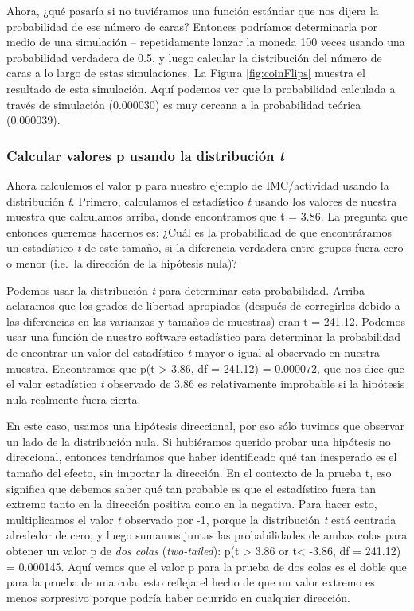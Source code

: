 \documentclass[
  12pt,
]{book}
\begin{document}
Ahora, ¿qué pasaría si no tuviéramos una función estándar que nos dijera la probabilidad de ese número de caras? Entonces podríamos determinarla por medio de una simulación -- repetidamente lanzar la moneda 100 veces usando una probabilidad verdadera de 0.5, y luego calcular la distribución del número de caras a lo largo de estas simulaciones. La Figura \ref{fig:coinFlips} muestra el resultado de esta simulación. Aquí podemos ver que la probabilidad calculada a través de simulación (0.000030) es muy cercana a la probabilidad teórica (0.000039).

\hypertarget{pvalues-tdist}{%
\subsubsection{\texorpdfstring{Calcular valores p usando la distribución \emph{t}}{Calcular valores p usando la distribución t}}\label{pvalues-tdist}}

Ahora calculemos el valor p para nuestro ejemplo de IMC/actividad usando la distribución \emph{t}. Primero, calculamos el estadístico \emph{t} usando los valores de nuestra muestra que calculamos arriba, donde encontramos que t = 3.86. La pregunta que entonces queremos hacernos es: ¿Cuál es la probabilidad de que encontráramos un estadístico \emph{t} de este tamaño, si la diferencia verdadera entre grupos fuera cero o menor (i.e.~la dirección de la hipótesis nula)?

Podemos usar la distribución \emph{t} para determinar esta probabilidad. Arriba aclaramos que los grados de libertad apropiados (después de corregirlos debido a las diferencias en las varianzas y tamaños de muestras) eran t = 241.12. Podemos usar una función de nuestro software estadístico para determinar la probabilidad de encontrar un valor del estadístico \emph{t} mayor o igual al observado en nuestra muestra. Encontramos que p(t \textgreater{} 3.86, df = 241.12) = 0.000072, que nos dice que el valor estadístico \emph{t} observado de 3.86 es relativamente improbable si la hipótesis nula realmente fuera cierta.

En este caso, usamos una hipótesis direccional, por eso sólo tuvimos que observar un lado de la distribución nula. Si hubiéramos querido probar una hipótesis no direccional, entonces tendríamos que haber identificado qué tan inesperado es el tamaño del efecto, sin importar la dirección. En el contexto de la prueba t, eso significa que debemos saber qué tan probable es que el estadístico fuera tan extremo tanto en la dirección positiva como en la negativa. Para hacer esto, multiplicamos el valor \emph{t} observado por -1, porque la distribución \emph{t} está centrada alrededor de cero, y luego sumamos juntas las probabilidades de ambas colas para obtener un valor p de \emph{dos colas} (\emph{two-tailed}): p(t \textgreater{} 3.86 or t\textless{} -3.86, df = 241.12) = 0.000145. Aquí vemos que el valor p para la prueba de dos colas es el doble que para la prueba de una cola, esto refleja el hecho de que un valor extremo es menos sorpresivo porque podría haber ocurrido en cualquier dirección.
\end{document}

